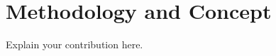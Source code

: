 \section{Methodology and Concept}\label{sec:methodology}

Explain your contribution here.

\lipsum[14-16]
